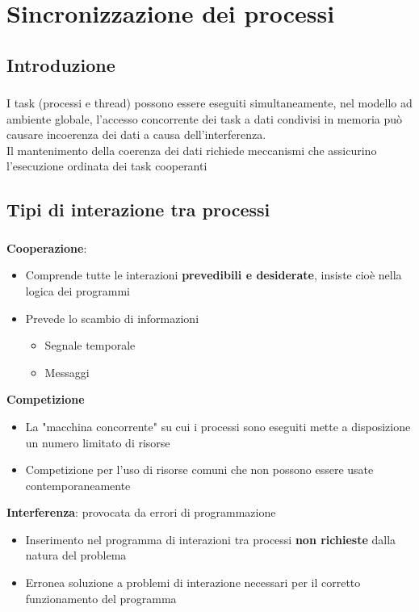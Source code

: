 \documentclass{beamer}
\newenvironment{mainframe}{
	\begin{frame}
		\frametitle{\insertsubsection}
		\framesubtitle{\insertsection}
	}{
	\end{frame}
}
\begin{document}
\section{Sincronizzazione dei processi}
\subsection{Introduzione}
\begin{mainframe}
	I task (processi e thread) possono essere eseguiti simultaneamente, nel modello ad ambiente globale, l'accesso concorrente dei task a dati condivisi in memoria può causare incoerenza dei dati a causa dell'interferenza.\\
	Il mantenimento della coerenza dei dati richiede meccanismi che assicurino l'esecuzione ordinata dei task cooperanti
\end{mainframe}
\subsection{Tipi di interazione tra processi}
\begin{mainframe}
	\textbf{Cooperazione}:
	\begin{itemize}
		\item Comprende tutte le interazioni \textbf{prevedibili e desiderate}, insiste cioè nella logica dei programmi
		\item Prevede lo scambio di informazioni
		\begin{itemize}
			\item Segnale temporale
			\item Messaggi
		\end{itemize}
	\end{itemize}
	\textbf{Competizione}
	\begin{itemize}
		\item La "macchina concorrente" su cui i processi sono eseguiti mette a disposizione un numero limitato di risorse
		\item Competizione per l'uso di risorse comuni che non possono essere usate contemporaneamente
	\end{itemize}
	\textbf{Interferenza}: provocata da errori di programmazione
	\begin{itemize}
		\item Inserimento nel programma di interazioni tra processi \textbf{non richieste} dalla natura del problema
		\item Erronea soluzione a problemi di interazione necessari per il corretto funzionamento del programma
	\end{itemize}
\end{mainframe}
\end{document}
